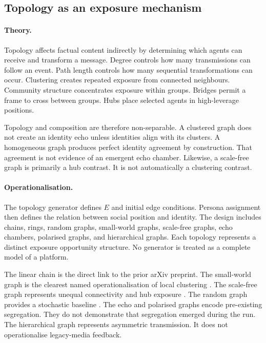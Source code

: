 \subsection{Topology as an exposure mechanism}
\label{subsec:topology-exposure}

\paragraph{Theory.}
Topology affects factual content indirectly by determining which agents can receive and transform a message.
Degree controls how many transmissions can follow an event.
Path length controls how many sequential transformations can occur.
Clustering creates repeated exposure from connected neighbours.
Community structure concentrates exposure within groups.
Bridges permit a frame to cross between groups.
Hubs place selected agents in high-leverage positions.

Topology and composition are therefore non-separable.
A clustered graph does not create an identity echo unless identities align with its clusters.
A homogeneous graph produces perfect identity agreement by construction.
That agreement is not evidence of an emergent echo chamber.
Likewise, a scale-free graph is primarily a hub contrast.
It is not automatically a clustering contrast.

\paragraph{Operationalisation.}
The topology generator defines \(E\) and initial edge conditions.
Persona assignment then defines the relation between social position and identity.
The design includes chains, rings, random graphs, small-world graphs, scale-free graphs, echo chambers, polarised graphs, and hierarchical graphs.
Each topology represents a distinct exposure opportunity structure.
No generator is treated as a complete model of a platform.

The linear chain is the direct link to the prior arXiv preprint.
The small-world graph is the clearest named operationalisation of local clustering \parencite{watts1998collective}.
The scale-free graph represents unequal connectivity and hub exposure \parencite{barabasi1999emergence}.
The random graph provides a stochastic baseline \parencite{erdos1960evolution}.
The echo and polarised graphs encode pre-existing segregation.
They do not demonstrate that segregation emerged during the run.
The hierarchical graph represents asymmetric transmission.
It does not operationalise legacy-media feedback.

